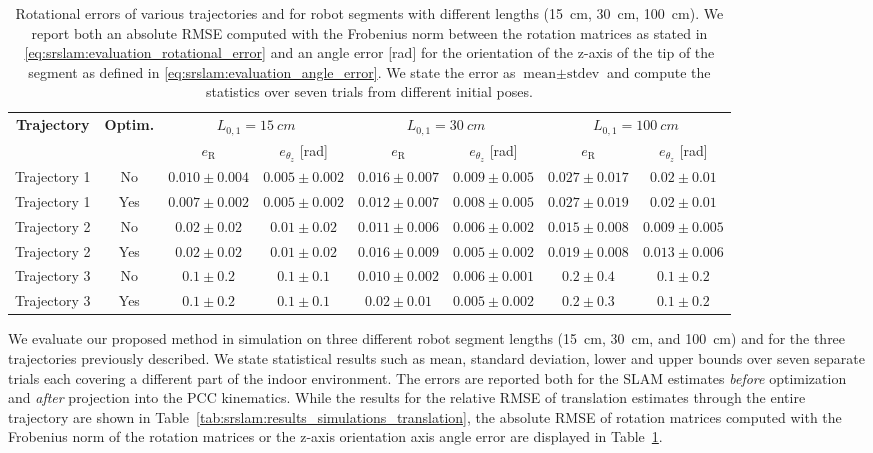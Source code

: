 \begin{table}\scriptsize
\centering
\caption{Rotational errors of various trajectories and for robot segments with different lengths (\SI{15}{cm}, \SI{30}{cm}, \SI{100}{cm}). We report both an absolute \gls{RMSE} computed with the Frobenius norm between the rotation matrices as stated in \eqref{eq:srslam:evaluation_rotational_error} and an angle error [rad] for the orientation of the z-axis of the tip of the segment as defined in \eqref{eq:srslam:evaluation_angle_error}. We state the error as $\text{mean} \pm \text{stdev}$ and compute the statistics over seven trials from different initial poses.}
\begin{tabular}{cc cc cc cc}
\toprule
    \multirow{2}{*}{\textbf{Trajectory}} & \multirow{2}{*}{\textbf{Optim.}} & \multicolumn{2}{c}{$L_{0,1} = \SI{15}{cm}$} & \multicolumn{2}{c}{$L_{0,1} = \SI{30}{cm}$} & \multicolumn{2}{c}{$L_{0,1} = \SI{100}{cm}$}\\
    & & $e_\mathrm{R}$ & $e_{\theta_z}$ [rad] & $e_\mathrm{R}$ & $e_{\theta_z}$ [rad] & $e_\mathrm{R}$ & $e_{\theta_z}$ [rad]\\
\midrule
    Trajectory 1 & No & $0.010 \pm 0.004$ & $0.005 \pm 0.002$ & $0.016 \pm 0.007$ & $0.009 \pm 0.005$ & $0.027 \pm 0.017$ & $0.02 \pm 0.01$ \\
    Trajectory 1 & Yes & $0.007 \pm 0.002$ & $0.005 \pm 0.002$ & $0.012 \pm 0.007$ & $0.008 \pm 0.005$ & $0.027 \pm 0.019$ & $0.02 \pm 0.01$ \\
    \midrule
    Trajectory 2 & No & $0.02 \pm 0.02$ & $0.01 \pm 0.02$ & $0.011 \pm 0.006$ & $0.006 \pm 0.002$ & $0.015 \pm 0.008$ &  $0.009 \pm 0.005$ \\
    Trajectory 2 & Yes & $0.02 \pm 0.02$ & $0.01 \pm 0.02$ & $0.016 \pm 0.009$ & $0.005 \pm 0.002$ & $0.019 \pm 0.008$ & $0.013 \pm 0.006$\\
    \midrule
    Trajectory 3 & No & $0.1 \pm 0.2$ &  $0.1 \pm 0.1$ & $0.010 \pm 0.002$ & $0.006 \pm 0.001$ & $0.2 \pm 0.4$ & $0.1 \pm 0.2$\\
    Trajectory 3 & Yes & $0.1 \pm 0.2$ & $0.1 \pm 0.1$ & $0.02 \pm 0.01$ & $0.005 \pm 0.002$ & $0.2 \pm 0.3$ & $0.1 \pm 0.2$\\
\bottomrule
\end{tabular}
\label{tab:srslam:results_simulations_rotation}
\end{table}

We evaluate our proposed method in simulation on three different robot segment lengths (\SI{15}{cm}, \SI{30}{cm}, and \SI{100}{cm}) and for the three trajectories previously described. 
We state statistical results such as mean, standard deviation, lower and upper bounds over seven separate trials each covering a different part of the indoor environment. 
The errors are reported both for the \gls{SLAM} estimates \emph{before} optimization and \emph{after} projection into the \gls{PCC} kinematics.
While the results for the relative \gls{RMSE} of translation estimates through the entire trajectory are shown in Table~\ref{tab:srslam:results_simulations_translation}, the absolute \gls{RMSE} of rotation matrices computed with the Frobenius norm of the rotation matrices or the z-axis orientation axis angle error are displayed in Table~\ref{tab:srslam:results_simulations_rotation}.

